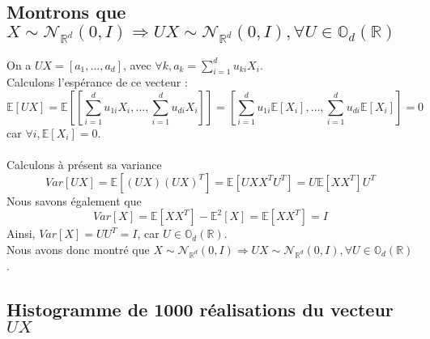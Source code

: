 \documentclass{report}
\begin{document}
		\subsection{Montrons que $X \sim \mathcal{N}_{\mathbb{R}^d}(0, I) \Rightarrow UX \sim \mathcal{N}_{\mathbb{R}^d}(0, I), \forall U \in \mathbb{O}_d(\mathbb{R})$}
			On a $UX = [a_1, \ldots, a_d]$, avec $\forall k, a_k = \sum\limits_{i=1}^d u_{ki}X_i$.\\
			Calculons l'espérance de ce vecteur : 
			\[ \mathbb{E}[UX] = \mathbb{E}\left[ [\sum\limits_{i=1}^d u_{1i}X_i, \ldots, \sum\limits_{i=1}^d u_{di}X_i]\right] = \left[ \sum\limits_{i=1}^d u_{1i}\mathbb{E}[X_i], \ldots, \sum\limits_{i=1}^d u_{di}\mathbb{E}[X_i]\right] = 0\]car $\forall i, \mathbb{E}[X_i] = 0$.\\
			\\
			Calculons à présent sa variance
			\[ Var[UX] = \mathbb{E}[(UX)(UX)^T] = \mathbb{E}[U X X^T U^T] = U \mathbb{E}[XX^T]U^T \]
			Nous savons également que
			\[ Var[X] = \mathbb{E}[X X^T] - \mathbb{E}^2[X] = \mathbb{E}[X X^T] = I \]
			Ainsi, $Var[X] = UU^T = I$, car $U \in \mathbb{O}_d(\mathbb{R})$.\\
			Nous avons donc montré que $X \sim \mathcal{N}_{\mathbb{R}^d}(0, I) \Rightarrow UX \sim \mathcal{N}_{\mathbb{R}^d}(0, I), \forall U \in \mathbb{O}_d(\mathbb{R})$.

		\subsection{Histogramme de 1000 réalisations du vecteur $UX$}
		
\end{document}
